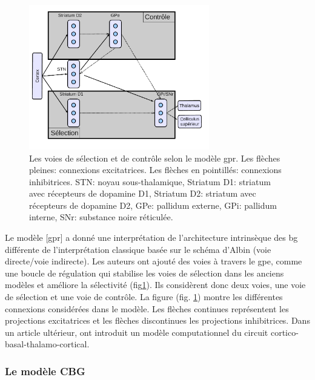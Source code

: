 \begin{figure}
\begin{center}
\includegraphics[width=0.7\textwidth]{figures/ch4_5_gpr}
\end{center}
\caption{Les voies de sélection et de contrôle selon le modèle \protect\gls{gpr}. Les flèches pleines: connexions excitatrices. Les flèches en pointillés: connexions inhibitrices. STN: noyau sous-thalamique, Striatum D1: striatum avec récepteurs de dopamine D1, Striatum D2: striatum avec récepteurs de dopamine D2, GPe: pallidum externe, GPi: pallidum interne, SNr: substance noire réticulée. }
\label{GPR}
\end{figure}


Le modèle [\gls{gpr}] a donné une interprétation de l'architecture intrinsèque des \gls{bg} différente de l'interprétation classique basée sur le schéma d'Albin \cite{Albin:1989} (voie directe/voie indirecte). Les auteurs ont ajouté des voies à travers le \gls{gpe}, comme une boucle de régulation qui stabilise les voies de sélection dans les anciens modèles et améliore la sélectivité (fig\ref{GPR}). Ils considèrent donc deux voies, une voie de sélection et une voie de contrôle. La figure (fig. \ref{GPR}) montre les différentes connexions considérées dans le modèle. Les flèches continues représentent les projections excitatrices et les flèches discontinues les projections inhibitrices. Dans un article ultérieur, \cite{Humphries:2002} ont introduit un modèle computationnel du circuit cortico-basal-thalamo-cortical.\\

\subsubsection{Le mod\`ele CBG}

